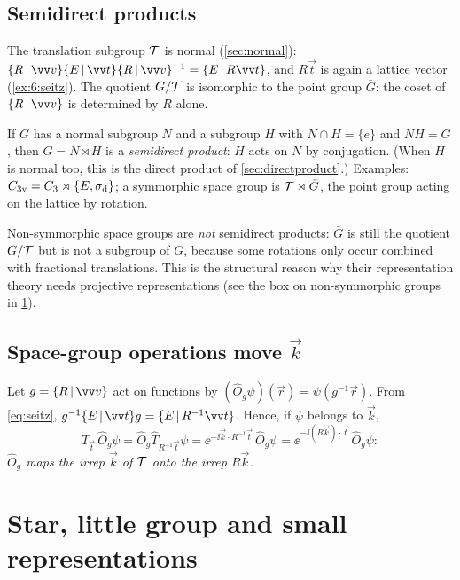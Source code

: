 \subsection{Semidirect products\beyondmark}\label{sec:semidirect}
The translation subgroup $\mathcal{T}$ is normal (\cref{sec:normal}):
$\seitz{R}{\vec{v}}\seitz{E}{\vec{t}}\seitz{R}{\vec{v}}^{-1}=\seitz{E}{R\vec{t}}$, and
$R\vec{t}$ is again a lattice vector (\cref{ex:6:seitz}). The quotient $G/\mathcal{T}$ is
isomorphic to the point group $\bar{G}$: the coset of $\seitz{R}{\vec{v}}$ is determined
by $R$ alone.

If $G$ has a normal subgroup $N$ and a subgroup $H$ with $N\cap H=\{e\}$ and $NH=G$,
then $G=N\rtimes H$ is a \emph{semidirect product}: $H$ acts on $N$ by conjugation.
(When $H$ is normal too, this is the direct product of \cref{sec:directproduct}.)
Examples: $C_{3\mathrm{v}}=C_3\rtimes\{E,\sigma_{\mathrm{d}}\}$; a symmorphic space group is
$\mathcal{T}\rtimes\bar{G}$, the point group acting on the lattice by rotation.

Non-symmorphic space groups are \emph{not} semidirect products: $\bar{G}$ is still the
quotient $G/\mathcal{T}$ but is not a subgroup of $G$, because some rotations only occur
combined with fractional translations. This is the structural reason why their
representation theory needs projective representations (see the box on non-symmorphic
groups in \cref{sec:star}).

\subsection{Space-group operations move \texorpdfstring{$\vec{k}$}{k}}
Let $g=\seitz{R}{\vec{v}}$ act on functions by $(\hat{O}_g\psi)(\vec{r})=\psi(g^{-1}\vec{r})$.
From \eqref{eq:seitz}, $g^{-1}\seitz{E}{\vec{t}}g=\seitz{E}{R^{-1}\vec{t}}$. Hence, if
$\psi$ belongs to $\vec{k}$,
\[
\hat{T}_{\vec{t}}\,\hat{O}_g\psi=\hat{O}_g\hat{T}_{R^{-1}\vec{t}}\psi
=\ee^{-\ii\vec{k}\cdot R^{-1}\vec{t}}\,\hat{O}_g\psi
=\ee^{-\ii(R\vec{k})\cdot\vec{t}}\,\hat{O}_g\psi :
\]
\emph{$\hat{O}_g$ maps the irrep $\vec{k}$ of $\mathcal{T}$ onto the irrep $R\vec{k}$.}

\section{Star, little group and small representations}\label{sec:star}

